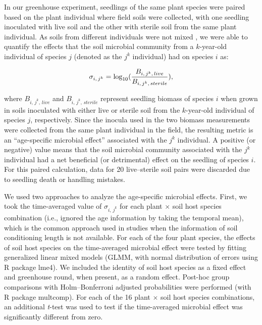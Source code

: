 In our greenhouse experiment, seedlings of the same plant species were paired based on the plant individual where field soils were collected, with one seedling inoculated with live soil and the other with sterile soil from the same plant individual. As soils from different individuals were not mixed \citep{Rinella2018}, we were able to quantify the effects that the soil microbial community from a $k$-year-old individual of species $j$ (denoted as the $j^{k}$ individual) had on species $i$ as:

\begin{equation}
\sigma_{i, \,j^{k}} = \textup{log}_{10}(\frac{B_{i, \,j^{k}, \,live}}{B_{i, \,j^{k}, \,sterile}}), \nonumber
\end{equation}

\noindent where $B_{i, \,j^{k}, \,live}$ and $B_{i, \,j^{k}, \,sterile}$ represent seedling biomass of species $i$ when grown in soils inoculated with either live or sterile soil from the $k$-year-old individual of species $j$, respectively. Since the inocula used in the two biomass measurements were collected from the same plant individual in the field, the resulting metric is an ``age-specific microbial effect'' associated with the $j^{k}$ individual. A positive (or negative) value means that the soil microbial community associated with the $j^{k}$ individual had a net beneficial (or detrimental) effect on the seedling of species $i$. For this paired calculation, data for 20 live--sterile soil pairs were discarded due to seedling death or handling mistakes. 
\par


We used two approaches to analyze the age-specific microbial effects. First, we took the time-averaged value of $\sigma_{i, \,j^{k}}$ for each plant $\times$ soil host species combination (i.e., ignored the age information by taking the temporal mean), which is the common approach used in studies when the information of soil conditioning length is not available. 
For each of the four plant species, the effects of soil host species on the time-averaged microbial effect were tested by fitting generalized linear mixed models (GLMM, with normal distribution of errors using R package lme4). We included the identity of soil host species as a fixed effect and greenhouse round, when present, as a random effect. Post-hoc group comparisons with Holm--Bonferroni adjusted probabilities were performed (with R package multcomp).
For each of the 16 plant $\times$ soil host species combinations, an additional \textit{t}-test was used to test if the time-averaged microbial effect was significantly different from zero.
\par
 
